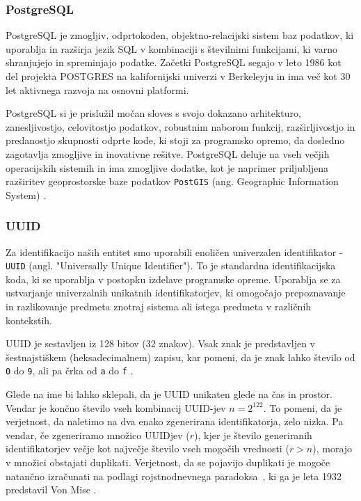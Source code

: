 \documentclass[a4paper, 12pt]{book}
\begin{document}
\subsubsection{PostgreSQL}
PostgreSQL je zmogljiv, odprtokoden, objektno-relacijski sistem baz podatkov, ki uporablja in razširja jezik SQL v kombinaciji s številnimi funkcijami, ki varno shranjujejo in spreminjajo podatke. Začetki PostgreSQL segajo v leto 1986 kot del projekta POSTGRES na kalifornijski univerzi v Berkeleyju in ima več kot 30 let aktivnega razvoja na osnovni platformi.

PostgreSQL si je prislužil močan sloves s svojo dokazano arhitekturo, zanesljivostjo, celovitostjo podatkov, robustnim naborom funkcij, razširljivostjo in predanostjo skupnosti odprte kode, ki stoji za programsko opremo, da dosledno zagotavlja zmogljive in inovativne rešitve. 
PostgreSQL deluje na vseh večjih operacijskih sistemih in ima zmogljive dodatke, kot je naprimer priljubljena razširitev geoprostorske baze podatkov \verb=PostGIS= (ang. Geographic Information System) \cite{pg-database-postgis}.


\subsubsection{UUID}
Za identifikacijo naših entitet smo uporabili enoličen univerzalen identifikator - \verb=UUID= (angl. "Universally Unique Identifier"). To je standardna identifikacijska koda, ki se uporablja v postopku izdelave programske opreme. Uporablja se za ustvarjanje univerzalnih unikatnih identifikatorjev, ki omogočajo prepoznavanje in razlikovanje predmeta znotraj sistema ali istega predmeta v različnih kontekstih.

UUID je sestavljen iz 128 bitov (32 znakov). Vsak znak je predstavljen v šestnajstiškem (heksadecimalnem) zapisu, kar pomeni, da je znak lahko število od \verb=0= do \verb=9=, ali pa črka od \verb=a= do \verb=f= \cite{uuid-rfc}.

Glede na ime bi lahko sklepali, da je UUID unikaten glede na čas in prostor. Vendar je končno število vseh kombinacij UUID-jev $n=2^{122}$. To pomeni, da je verjetnost, da naletimo na dva enako zgenerirana identifikatorja, zelo nizka.
Pa vendar, če zgeneriramo množico UUIDjev ($r$), kjer je število generiranih identifikatorjev večje kot največje število vseh mogočih vrednosti ($r > n$), morajo v množici obstajati duplikati. Verjetnost, da se pojavijo duplikati je mogoče natančno izračunati na podlagi rojstnodnevnega paradoksa~\cite{birthday-problem-what-is}, ki ga je leta 1932 predstavil Von Mise \cite{birthday-problem-inventor}.
\end{document}
